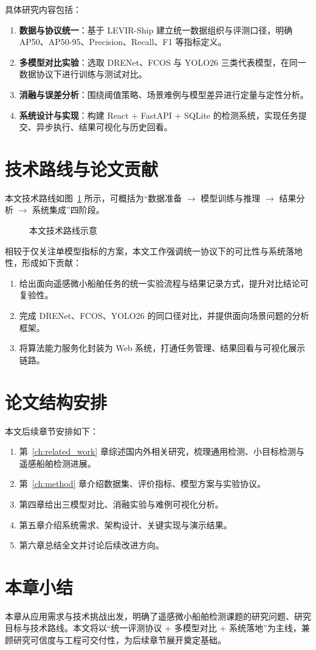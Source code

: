 具体研究内容包括：

\begin{enumerate}
  \item \textbf{数据与协议统一}：基于 LEVIR-Ship 建立统一数据组织与评测口径，明确 AP50、AP50-95、Precision、Recall、F1 等指标定义。
  \item \textbf{多模型对比实验}：选取 DRENet、FCOS 与 YOLO26 三类代表模型，在同一数据协议下进行训练与测试对比。
  \item \textbf{消融与误差分析}：围绕阈值策略、场景难例与模型差异进行定量与定性分析。
  \item \textbf{系统设计与实现}：构建 React + FastAPI + SQLite 的检测系统，实现任务提交、异步执行、结果可视化与历史回看。
\end{enumerate}

\section{技术路线与论文贡献}

本文技术路线如图~\ref{fig:ch1_pipeline} 所示，可概括为“数据准备 $\rightarrow$ 模型训练与推理 $\rightarrow$ 结果分析 $\rightarrow$ 系统集成”四阶段。

\begin{figure}[htbp]
  \centering
  \caption{本文技术路线示意}
  \label{fig:ch1_pipeline}
\end{figure}

相较于仅关注单模型指标的方案，本文工作强调统一协议下的可比性与系统落地性，形成如下贡献：

\begin{enumerate}
  \item 给出面向遥感微小船舶任务的统一实验流程与结果记录方式，提升对比结论可复验性。
  \item 完成 DRENet、FCOS、YOLO26 的同口径对比，并提供面向场景问题的分析框架。
  \item 将算法能力服务化封装为 Web 系统，打通任务管理、结果回看与可视化展示链路。
\end{enumerate}

\section{论文结构安排}

本文后续章节安排如下：

\begin{enumerate}
  \item 第~\ref{ch:related_work} 章综述国内外相关研究，梳理通用检测、小目标检测与遥感船舶检测进展。
  \item 第~\ref{ch:method} 章介绍数据集、评价指标、模型方案与实验协议。
  \item 第四章给出三模型对比、消融实验与难例可视化分析。
  \item 第五章介绍系统需求、架构设计、关键实现与演示结果。
  \item 第六章总结全文并讨论后续改进方向。
\end{enumerate}

\section{本章小结}

本章从应用需求与技术挑战出发，明确了遥感微小船舶检测课题的研究问题、研究目标与技术路线。本文将以“统一评测协议 + 多模型对比 + 系统落地”为主线，兼顾研究可信度与工程可交付性，为后续章节展开奠定基础。
